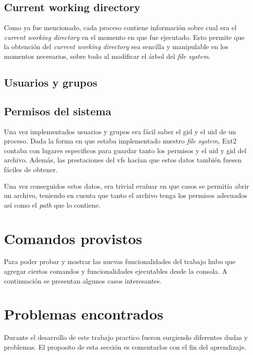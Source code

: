 \documentclass[a4paper,10pt]{article}
\begin{document}
    \subsection{Current working directory}
        
    Como ya fue mencionado, cada proceso contiene información sobre cual era el \textit{current working directory} en
    el momento en que fue ejecutado. Esto permite que la obtención del \textit{current working directory} sea sencilla
    y manipulable en los momentos necesarios, sobre todo al modificar el árbol del \textit{file system}.

    \subsection{Usuarios y grupos}
    
    \subsection{Permisos del sistema}

    Una vez implementados usuarios y grupos era fácil saber el gid y el uid de un proceso. Dada la forma en que estaba
    implementado nuestro \textit{file system}, Ext2 contaba con lugares especificos para guardar tanto los permisos y el
    uid y gid del archivo. Además, las prestaciones del vfs hacían que estos datos también fuesen fáciles de obtener.

    Una vez conseguidos estos datos, era trivial evaluar en que casos se permitía abrir un archivo, teniendo en cuenta
    que tanto el archivo tenga los permisos adecuados así como el \textit{path} que lo contiene.

\newpage
\section{Comandos provistos}
    Para poder probar y mostrar las nuevas funcionalidades del trabajo hubo que agregar ciertos comandos y
    funcionalidades ejecutables desde la consola. A continuación se presentan algunos casos interesantes.

\newpage
\section{Problemas encontrados}

Durante el desarrollo de este trabajo practico fueron surgiendo diferentes dudas y problemas. El proposito de esta
sección es comentarlos con el fin del aprendizaje.
\end{document}
